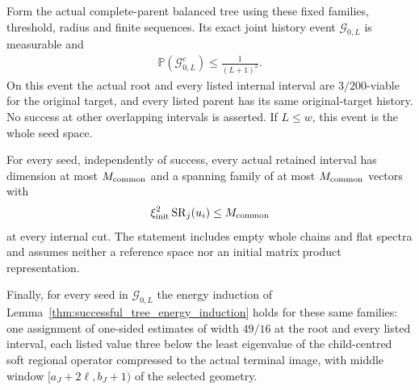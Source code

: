 \begin{theorem}
    Form the actual complete-parent balanced tree using these fixed
    families, threshold, radius and finite sequences. Its exact joint
    history event $\mathcal G_{0,L}$ is measurable and
    \begin{align}
        \mathbb P(\mathcal G_{0,L}^c)\le\frac1{(L+1)^2}.
        \label{eq:physical_soft_tree_probability}
    \end{align}
    On this event the actual root and every listed internal interval
    are $3/200$-viable for the original target, and every listed parent
    has its same original-target history. No success at other overlapping
    intervals is asserted. If $L\le w$, this event is the whole seed space.

    For every seed, independently of success, every actual retained
    interval has dimension at most $M_{\rm common}$ and a spanning family
    of at most $M_{\rm common}$ vectors with
    \begin{align}
        \xi_{\rm init}^2\operatorname{SR}_j(u_i)\le M_{\rm common}
        \label{eq:physical_soft_tree_recorded_ranks}
    \end{align}
    at every internal cut. The statement includes empty whole chains
    and flat spectra and assumes neither a reference space nor an
    initial matrix product representation.

    Finally, for every seed in $\mathcal G_{0,L}$ the energy induction of
    Lemma~\ref{thm:successful_tree_energy_induction} holds for these same
    families: one assignment of one-sided estimates of width $49/16$ at the
    root and every listed interval, each listed value three below the least
    eigenvalue of the child-centred soft regional operator compressed to the
    actual terminal image, with middle window
    $[a_J+2\ell,b_J+1)$ of the selected geometry.
\end{theorem}

